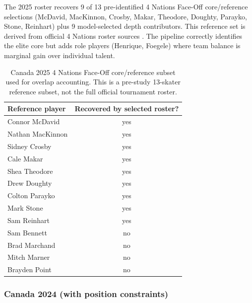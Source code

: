 \documentclass[11pt,letterpaper]{article}
\begin{document}
The 2025 roster recovers 9 of 13 pre-identified 4 Nations Face-Off
core/reference selections
(McDavid, MacKinnon, Crosby, Makar, Theodore, Doughty, Parayko, Stone,
Reinhart) plus 9 model-selected depth contributors. This reference set
is derived from official 4 Nations roster sources
\citep{hockeyCanada4Nations,nhlFourNationsRosters}. The pipeline
correctly identifies the elite core but adds role players (Henrique,
Foegele) where team balance is marginal gain over individual talent.

\begin{table}[htbp]
  \centering
  \small
  \caption{Canada 2025 4 Nations Face-Off core/reference subset used
    for overlap accounting. This is a pre-study 13-skater reference
    subset, not the full official tournament roster.}
  \begin{tabular}{l c}
    \toprule
    Reference player & Recovered by selected roster? \\
    \midrule
    Connor McDavid & yes \\
    Nathan MacKinnon & yes \\
    Sidney Crosby & yes \\
    Cale Makar & yes \\
    Shea Theodore & yes \\
    Drew Doughty & yes \\
    Colton Parayko & yes \\
    Mark Stone & yes \\
    Sam Reinhart & yes \\
    Sam Bennett & no \\
    Brad Marchand & no \\
    Mitch Marner & no \\
    Brayden Point & no \\
    \bottomrule
  \end{tabular}
\end{table}

\subsubsection{Canada 2024 (with position constraints)}
\end{document}
